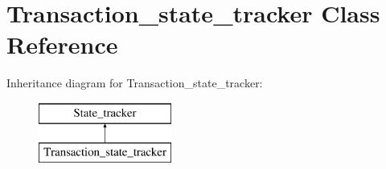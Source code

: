 \hypertarget{classTransaction__state__tracker}{}\section{Transaction\+\_\+state\+\_\+tracker Class Reference}
\label{classTransaction__state__tracker}
Inheritance diagram for Transaction\+\_\+state\+\_\+tracker\+:\begin{figure}[H]
\begin{center}
\leavevmode
\includegraphics[height=2.000000cm]{classTransaction__state__tracker}
\end{center}
\end{figure}
